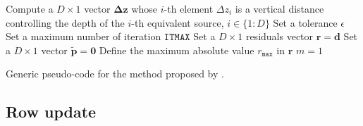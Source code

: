 \begin{algorithm}
	\Input{}
	Compute a $D \times 1$ vector $\boldsymbol{\Delta}\mathbf{z}$ whose $i$-th element $\Delta z_{i}$ 
	is a vertical distance controlling the depth of the $i$-th equivalent source, $i \in \{1:D\}$ \;
	Set a tolerance $\epsilon$ \;
	Set a maximum number of iteration $\mathtt{ITMAX}$ \;
	Set a $D \times 1$ residuals vector $\mathbf{r} = \mathbf{d}$ \;
	Set a $D \times 1$ vector $\tilde{\mathbf{p}} = \mathbf{0}$ \;
	Define the maximum absolute value $r_{\mathtt{max}}$ in $\mathbf{r}$ \;
	$m = 1$ \;
	\caption{Generic pseudo-code for the method proposed by \cite{cordell1992}.}
	\label{alg:C92}
\end{algorithm}

\subsection{Row update}

